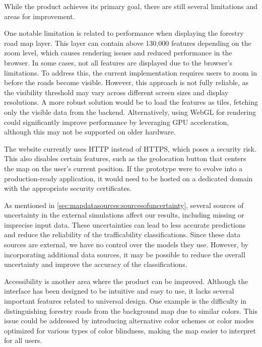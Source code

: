 
While the product achieves its primary goal, there are still several limitations and areas for improvement.

One notable limitation is related to performance when displaying the forestry road map layer. This layer can contain above 130,000 features depending on the zoom level, which causes rendering issues and reduced performance in the browser. In some cases, not all features are displayed due to the browser's limitations. To address this, the current implementation requires users to zoom in before the roads become visible. However, this approach is not fully reliable, as the visibility threshold may vary across different screen sizes and display resolutions. A more robust solution would be to load the features as tiles, fetching only the visible data from the backend. Alternatively, using WebGL for rendering could significantly improve performance by leveraging GPU acceleration, although this may not be supported on older hardware.

The website currently uses HTTP instead of HTTPS, which poses a security risk. This also disables certain features, such as the geolocation button that centers the map on the user's current position. If the prototype were to evolve into a production-ready application, it would need to be hosted on a dedicated domain with the appropriate security certificates.

As mentioned in \autoref{sec:mapdatasources:sourcesofuncertainty}, several sources of uncertainty in the external simulations affect our results, including missing or imprecise input data. These uncertainties can lead to less accurate predictions and reduce the reliability of the trafficability classifications. Since these data sources are external, we have no control over the models they use. However, by incorporating additional data sources, it may be possible to reduce the overall uncertainty and improve the accuracy of the classifications.

Accessibility is another area where the product can be improved. Although the interface has been designed to be intuitive and easy to use, it lacks several important features related to universal design. One example is the difficulty in distinguishing forestry roads from the background map due to similar colors. This issue could be addressed by introducing alternative color schemes or color modes optimized for various types of color blindness, making the map easier to interpret for all users.

